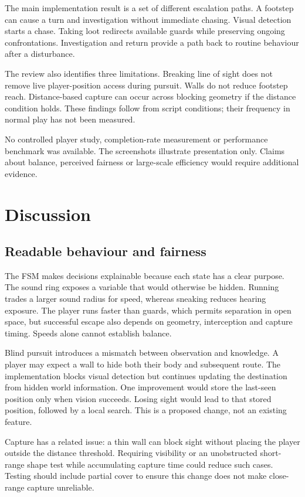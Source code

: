 \documentclass[fleqn,10pt]{SelfArx}
\begin{document}
The main implementation result is a set of different escalation paths. A footstep can cause a turn and investigation without immediate chasing. Visual detection starts a chase. Taking loot redirects available guards while preserving ongoing confrontations. Investigation and return provide a path back to routine behaviour after a disturbance.

The review also identifies three limitations. Breaking line of sight does not remove live player-position access during pursuit. Walls do not reduce footstep reach. Distance-based capture can occur across blocking geometry if the distance condition holds. These findings follow from script conditions; their frequency in normal play has not been measured.

No controlled player study, completion-rate measurement or performance benchmark was available. The screenshots illustrate presentation only. Claims about balance, perceived fairness or large-scale efficiency would require additional evidence.

\section{Discussion}
\subsection{Readable behaviour and fairness}
The FSM makes decisions explainable because each state has a clear purpose. The sound ring exposes a variable that would otherwise be hidden. Running trades a larger sound radius for speed, whereas sneaking reduces hearing exposure. The player runs faster than guards, which permits separation in open space, but successful escape also depends on geometry, interception and capture timing. Speeds alone cannot establish balance.

Blind pursuit introduces a mismatch between observation and knowledge. A player may expect a wall to hide both their body and subsequent route. The implementation blocks visual detection but continues updating the destination from hidden world information. One improvement would store the last-seen position only when vision succeeds. Losing sight would lead to that stored position, followed by a local search. This is a proposed change, not an existing feature.

Capture has a related issue: a thin wall can block sight without placing the player outside the distance threshold. Requiring visibility or an unobstructed short-range shape test while accumulating capture time could reduce such cases. Testing should include partial cover to ensure this change does not make close-range capture unreliable.
\end{document}
